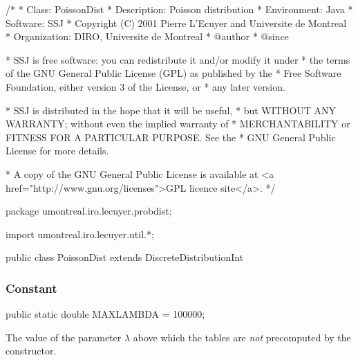 \begin{code}
\begin{hide}
/*
 * Class:        PoissonDist
 * Description:  Poisson distribution
 * Environment:  Java
 * Software:     SSJ
 * Copyright (C) 2001  Pierre L'Ecuyer and Universite de Montreal
 * Organization: DIRO, Universite de Montreal
 * @author
 * @since

 * SSJ is free software: you can redistribute it and/or modify it under
 * the terms of the GNU General Public License (GPL) as published by the
 * Free Software Foundation, either version 3 of the License, or
 * any later version.

 * SSJ is distributed in the hope that it will be useful,
 * but WITHOUT ANY WARRANTY; without even the implied warranty of
 * MERCHANTABILITY or FITNESS FOR A PARTICULAR PURPOSE.  See the
 * GNU General Public License for more details.

 * A copy of the GNU General Public License is available at
   <a href="http://www.gnu.org/licenses">GPL licence site</a>.
 */
\end{hide}
package umontreal.iro.lecuyer.probdist;\begin{hide}
import umontreal.iro.lecuyer.util.*;\end{hide}

public class PoissonDist extends DiscreteDistributionInt\begin{hide} {

   private double lambda;
\end{hide}
\end{code}
\unmoved\begin{detailed}
\subsubsection* {Constant}

\begin{code}

   public static double MAXLAMBDA = 100000;
\end{code}
 \begin{tabb} The value of the parameter  $\lambda$ above which
  the tables are {\em not\/} precomputed by the constructor.
\end{tabb}
\end{detailed}

